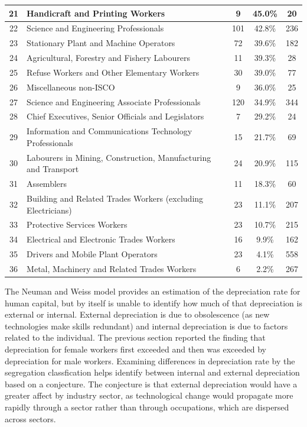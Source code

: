 \documentclass[12pt,a4paper]{article}
\numberwithin{equation}{section}
\begin{document}
\begin{table}[!ht]
\begin{small}
\begin{tabular}{cp{10cm}ccc}
				21 & Handicraft and Printing Workers & 9 & 45.0\% &  20 \\ \hline
				22 & Science and Engineering Professionals & 101 & 42.8\% & 236 \\ 
				23 & Stationary Plant and Machine Operators & 72 & 39.6\% & 182 \\ 
				24 & Agricultural, Forestry and Fishery Labourers & 11 & 39.3\% &  28 \\ 
				25 & Refuse Workers and Other Elementary Workers & 30 & 39.0\% &  77 \\ 
				26 & Miscellaneous non-ISCO & 9 & 36.0\% &  25 \\ 
				27 & Science and Engineering Associate Professionals & 120 & 34.9\% & 344 \\ 
				28 & Chief Executives, Senior Officials and Legislators & 7 & 29.2\% &  24 \\ 
				29 & Information and Communications Technology Professionals & 15 & 21.7\% &  69 \\ 
				30 & Labourers in Mining, Construction, Manufacturing and Transport & 24 & 20.9\% & 115 \\ 
				31 & Assemblers & 11 & 18.3\% &  60 \\ 
				32 & Building and Related Trades Workers (excluding Electricians) & 23 & 11.1\% & 207 \\ 
				33 & Protective Services Workers & 23 & 10.7\% & 215 \\ 
				34 & Electrical and Electronic Trades Workers & 16 & 9.9\% & 162 \\ 
				35 & Drivers and Mobile Plant Operators & 23 & 4.1\% & 558 \\ 
				36 & Metal, Machinery and Related Trades Workers & 6 & 2.2\% & 267 \\ 
				\hline
			\end{tabular}
		\end{small}
	\end{table}

The Neuman and Weiss model provides an estimation of the depreciation rate for human capital, but by itself is unable to identify how much of that  depreciation is external or internal. External depreciation is due to obsolescence (as new technologies make skills redundant) and internal depreciation is due to factors related to the individual. The previous section reported the finding that depreciation for female workers first exceeded and  then was exceeded by depreciation for male workers. Examining differences in depreciation rate by the segregation classfication helps identify between internal and external depreciation based on a conjecture. The conjecture is that external depreciation would have a greater affect by industry sector, as technological change would propagate more rapidly through a sector rather than through occupations, which are dispersed across sectors. 
\end{document}
